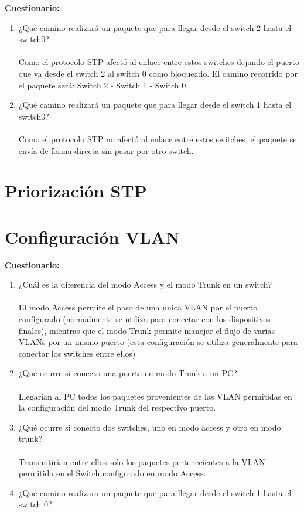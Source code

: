 \documentclass{udpreport}
\begin{document}
	{\large \bf{Cuestionario: }}\\
	\begin{enumerate}
	    \item ¿Qué camino realizará un paquete que para llegar desde el switch
2 hasta el switch0?\\\\
        Como el protocolo STP afectó al enlace entre estos switches dejando el puerto que va desde el switch 2 al switch 0 como
        bloqueado. El camino recorrido por el paquete será: Switch 2 - Switch 1 - Switch 0. 
        \item  ¿Qué camino realizará un paquete que para llegar desde el switch
1 hasta el switch0?\\\\
          Como el protocolo STP no afectó al enlace entre estos switches, el paquete se envía de forma directa sin pasar por otro
          switch.
	\end{enumerate}
	\section{Priorización STP}
	
	\section{Configuración VLAN}
	
	{\large \bf{Cuestionario: }}\\
	\begin{enumerate}
	    \item ¿Cuál es la diferencia del modo Access y el modo Trunk en un switch?\\\\
	         El modo Access permite el paso de una única VLAN por el puerto configurado (normalmente se utiliza para conectar con
	         los dispositivos finales), mientras que el modo Trunk permite manejar el flujo de varías VLANs por un mismo puerto 
	         (esta configuración se utiliza generalmente para conectar los switches entre ellos)
        \item  ¿Qué ocurre si conecto una puerta en modo Trunk a un PC?\\\\
            Llegarían al PC todos los paquetes provenientes de las VLAN permitidas en la configuración del modo Trunk del respectivo
            puerto.
        \item ¿Qué ocurre si conecto dos switches, uno en modo access y otro en modo trunk?\\\\
              Transmitirían entre ellos solo los paquetes pertenecientes a la VLAN 
  	      permitida en el Switch configurado en modo Access.
  	     \item  ¿Qué camino realizara un paquete que para llegar desde el switch 1 hasta el switch 0?\\\\
  	     
	\end{enumerate}
\end{document}
